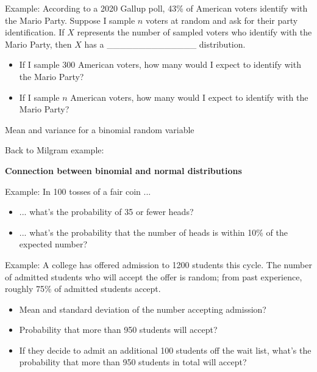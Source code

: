 \documentclass[11pt,letterpaper,twoside]{article}
\begin{document}
Example: According to a 2020 Gallup poll, 43\% of American voters identify with the Mario Party.  Suppose I sample $n$ voters at random and ask for their party identification. If $X$ represents the number of sampled voters who identify with the Mario Party, then $X$ has a \_\_\_\_\_\_\_\_\_\_\_\_\_\_ distribution.

\begin{itemize}

\item If I sample 300 American voters, how many would I expect to identify with the Mario Party? \vspace{30pt}

\item If I sample $n$ American voters, how many would I expect to identify with the Mario Party? \vspace{30pt}

\end{itemize}

Mean and variance for a binomial random variable \vspace{150pt}

Back to Milgram example: \vspace{80pt}

{\bf Connection between binomial and normal distributions}

\newpage

Example:  In 100 tosses of a fair coin ... 

\begin{itemize}

\item ... what's the probability of 35 or fewer heads? \vspace{80pt}

\item ... what's the probability that the number of heads is within 10\% of the expected number? \vspace{80pt}

\end{itemize}

Example: A college has offered admission to 1200 students this cycle. The number of admitted students who will accept the offer is random; from past experience, roughly 75\% of admitted students accept. 

\begin{itemize}

\item Mean and standard deviation of the number accepting admission? \vspace{80pt}

\item Probability that more than 950 students will accept? \vspace{80pt}

\item If they decide to admit an additional 100 students off the wait list, what's the probability that more than 950 students in total will accept?

\end{itemize}

\label{totalpag}
\end{document}

